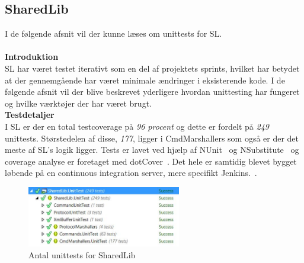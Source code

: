 \subsection{SharedLib}
I de følgende afsnit vil der kunne læses om unittests for \gls{SL}.\\\\


\textbf{Introduktion}\\
\gls{SL} har været testet iterativt som en del af projektets sprints, hvilket har betydet at der gennemgående har været minimale ændringer i eksisterende kode. I de følgende afsnit vil der blive beskrevet yderligere hvordan unittesting har fungeret og hvilke værktøjer der har været brugt.\\

\textbf{Testdetaljer}\\
I \gls{SL} er der en total testcoverage på \textit{96 procent} og dette er fordelt på \textit{249} unittests. Størstedelen af disse, \textit{177}, ligger i CmdMarshallers som også er der det meste af \gls{SL}'s logik ligger. Tests er lavet ved hjælp af NUnit~\cite{NUnit} og NSubstitute~\cite{NSubstitute} og coverage analyse er foretaget med dotCover~\cite{dotCover}. Det hele er samtidig blevet bygget løbende på en continuous integration server, mere specifikt Jenkins.~\cite{Jenkins}.

\begin{figure}[H]
	\centering
	\includegraphics[width=0.60\textwidth]{Test/SharedLib/UnitTests/Unittests.jpg}
	\caption{Antal unittests for SharedLib}
	\label{fig:antalunitSL}
\end{figure}

